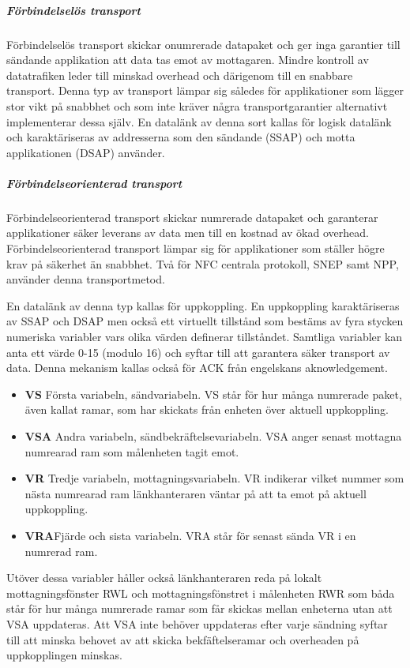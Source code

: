 \documentclass[11pt]{article}
\begin{document}
\subparagraph{Förbindelselös transport}
Förbindelselös transport skickar onumrerade datapaket och ger inga garantier till sändande applikation att data tas emot av mottagaren. Mindre kontroll av datatrafiken leder till minskad overhead och därigenom till en snabbare transport. Denna typ av transport lämpar sig således för applikationer som lägger stor vikt på snabbhet och som inte kräver några transportgarantier alternativt implementerar dessa själv. En datalänk av denna sort kallas för logisk datalänk och karaktäriseras av addresserna som den sändande (SSAP) och motta applikationen (DSAP) använder.

\subparagraph{Förbindelseorienterad transport}
Förbindelseorienterad transport skickar numrerade datapaket och garanterar applikationer säker leverans av data men till en kostnad av ökad overhead. Förbindelseorienterad transport lämpar sig för applikationer som ställer högre krav på säkerhet än snabbhet. Två för NFC centrala protokoll, SNEP samt NPP, använder denna transportmetod.

En datalänk av denna typ kallas för uppkoppling. En uppkoppling karaktäriseras av SSAP och DSAP men också ett virtuellt tillstånd som bestäms av fyra stycken numeriska variabler vars olika värden definerar tillståndet. Samtliga variabler kan anta ett värde 0-15 (modulo 16) och syftar till att garantera säker transport av data. Denna mekanism kallas också för ACK från engelskans aknowledgement.

\begin{itemize}
\item \textbf{VS} Första variabeln, sändvariabeln. VS står för hur många numrerade paket, även kallat ramar, som har skickats från enheten över aktuell uppkoppling.
\item \textbf{VSA} Andra variabeln, sändbekräftelsevariabeln. VSA anger senast mottagna numrearad ram som målenheten tagit emot.
\item \textbf{VR} Tredje variabeln, mottagningsvariabeln. VR indikerar vilket nummer som nästa numrearad ram länkhanteraren väntar på att ta emot på aktuell uppkoppling.
\item \textbf{VRA}Fjärde och sista variabeln. VRA står för senast sända VR i en numrerad ram.
\end{itemize}

Utöver dessa variabler håller också länkhanteraren reda på lokalt mottagningsfönster RWL och mottagningsfönstret i målenheten RWR som båda står för hur många numrerade ramar som får skickas mellan enheterna utan att VSA uppdateras. Att VSA inte behöver uppdateras efter varje sändning syftar till att minska behovet av att skicka bekfäftelseramar och overheaden på uppkopplingen minskas.
\end{document}
